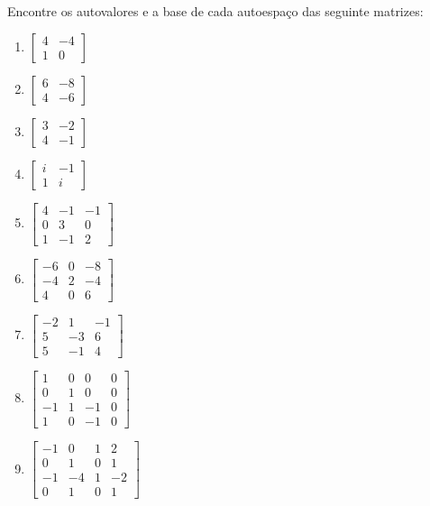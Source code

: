 \begin{question}
  Encontre os autovalores e a base de cada autoespaço das seguinte matrizes:
  \begin{multicols}{3}
    \begin{enumerate}[label=\alph*)]
      \item $\begin{bmatrix}
                4 & -4 \\ 1 & 0
              \end{bmatrix}$
      \item $\begin{bmatrix}
                6 & -8 \\ 4  & -6
              \end{bmatrix}$
      \item $\begin{bmatrix}
                3 & -2 \\ 4 & -1
              \end{bmatrix}$
      \item $\begin{bmatrix}
                i & -1 \\1 & i
              \end{bmatrix}$
      \item $\begin{bmatrix}
                4 & -1 & -1 \\ 0 & 3 & 0 \\ 1 & -1 & 2
              \end{bmatrix}$
      \item $\begin{bmatrix}
                -6 & 0 & -8 \\ -4 & 2 & -4 \\ 4 & 0 & 6
              \end{bmatrix}$
      \item $\begin{bmatrix}
                -2 & 1 & -1 \\ 5 & -3 & 6 \\ 5 & -1 & 4
              \end{bmatrix}$
      \item $\begin{bmatrix}
                1 & 0 & 0 & 0 \\ 0 & 1 & 0 & 0 \\ -1 & 1 & -1 & 0 \\ 1 & 0 & -1 & 0
              \end{bmatrix}$
      \item $\begin{bmatrix}
                -1 & 0 & 1 & 2 \\ 0 & 1 & 0 & 1 \\ -1 & -4 & 1 & -2 \\ 0 & 1 & 0 & 1
              \end{bmatrix}$
    \end{enumerate}
  \end{multicols}
\end{question}

